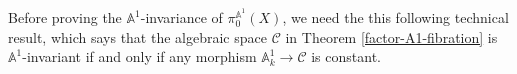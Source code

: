 \documentclass[11pt, reqno]{amsart}
\theoremstyle{plain}
\newtheorem{lemma}[thm]{Lemma}
\theoremstyle{definition}
\newcommand{\Spec}{{\rm Spec \,}}
\newcommand{\sC}{{\mathcal C}}
\newcommand{\A}{{\mathbb A}}
\begin{document}
Before proving the $\A^1$-invariance of $\pi_0^{\A^1}(X)$,
we need the
 this following technical result, which says that the algebraic space $\sC$ in Theorem \ref{factor-A1-fibration} is $\A^1$-invariant if and only if any morphism $\mathbb{A}^1_k \to \sC$ is constant. 
%		
%			
\end{document}
